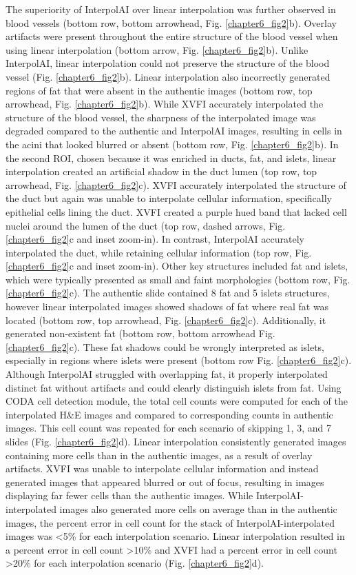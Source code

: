 \begin{refsection}
    The superiority of InterpolAI over linear interpolation was further observed in blood vessels (bottom row, bottom arrowhead, Fig. \ref{chapter6_fig2}b). Overlay artifacts were present throughout the entire structure of the blood vessel when using linear interpolation (bottom arrow, Fig. \ref{chapter6_fig2}b). Unlike InterpolAI, linear interpolation could not preserve the structure of the blood vessel (Fig. \ref{chapter6_fig2}b). Linear interpolation also incorrectly generated regions of fat that were absent in the authentic images (bottom row, top arrowhead, Fig. \ref{chapter6_fig2}b). While XVFI accurately interpolated the structure of the blood vessel, the sharpness of the interpolated image was degraded compared to the authentic and InterpolAI images, resulting in cells in the acini that looked blurred or absent (bottom row, Fig. \ref{chapter6_fig2}b). 
    In the second ROI, chosen because it was enriched in ducts, fat, and islets, linear interpolation created an artificial shadow in the duct lumen (top row, top arrowhead, Fig. \ref{chapter6_fig2}c). XVFI accurately interpolated the structure of the duct but again was unable to interpolate cellular information, specifically epithelial cells lining the duct.  XVFI created a purple hued band that lacked cell nuclei around the lumen of the duct (top row, dashed arrows, Fig. \ref{chapter6_fig2}c and inset zoom-in).  In contrast, InterpolAI accurately interpolated the duct, while retaining cellular information (top row, Fig. \ref{chapter6_fig2}c and inset zoom-in). Other key structures included fat and islets, which were typically presented as small and faint morphologies (bottom row, Fig. \ref{chapter6_fig2}c). The authentic slide contained 8 fat and 5 islets structures, however linear interpolated images showed shadows of fat where real fat was located (bottom row, top arrowhead, Fig. \ref{chapter6_fig2}c). Additionally, it generated non-existent fat (bottom row, bottom arrowhead Fig. \ref{chapter6_fig2}c). These fat shadows could be wrongly interpreted as islets, especially in regions where islets were present (bottom row Fig. \ref{chapter6_fig2}c). Although InterpolAI struggled with overlapping fat, it properly interpolated distinct fat without artifacts and could clearly distinguish islets from fat.
    Using CODA cell detection module, the total cell counts were computed for each of the interpolated H\&E images and compared to corresponding counts in authentic images. This cell count was repeated for each scenario of skipping 1, 3, and 7 slides (Fig. \ref{chapter6_fig2}d). Linear interpolation consistently generated images containing more cells than in the authentic images, as a result of overlay artifacts. XVFI was unable to interpolate cellular information and instead generated images that appeared blurred or out of focus, resulting in images displaying far fewer cells than the authentic images. While InterpolAI-interpolated images also generated more cells on average than in the authentic images, the percent error in cell count for the stack of InterpolAI-interpolated images was <5\% for each interpolation scenario. Linear interpolation resulted in a percent error in cell count >10\% and XVFI had a percent error in cell count >20\% for each interpolation scenario (Fig. \ref{chapter6_fig2}d). 

\end{refsection}
